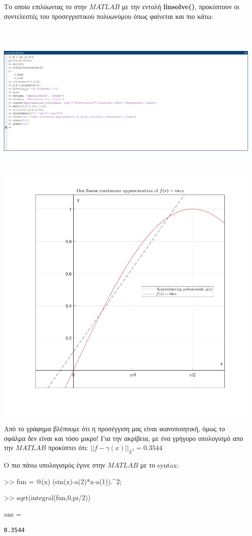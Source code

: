 \documentclass[12pt]{article}
\begin{document}
Το οποίο επιλύωντας το στην \(MATLAB\) με την εντολή
\textbf{linsolve()}, προκύπτουν οι συντελεστές του προσεγγιστικού
πολυωνύμου όπως φαίνεται και πιο κάτω:

 \includegraphics[width=16cm, height=8cm]{cont_method_lsq_3.jpg}
\includegraphics[width=16cm, height=13cm]{cont_method_lsq_2.jpg}

    Από το γράφημα βλέπουμε ότι η προσέγγιση μας είναι ικανοποιητική, όμως
το σφάλμα δεν είναι και τόσο μικρο! Για την ακρίβεια, με ένα γρήγορο
υπολογισμό απο την \(MATLAB\) προκύπτει ότι:
\(||f-\gamma (x)||_{L^2}= 0.3544\)

\begin{tcolorbox}
Ο πιο πάνω υπολογισμός έγινε στην \(MATLAB\) με το syntax:

>> fun = @(x) (sin(x)-a(2)*x-a(1)).\^{}2;

>> sqrt(integral(fun,0,pi/2))

ans =

\begin{verbatim}
0.3544 
\end{verbatim}
\end{tcolorbox}
\end{document}
